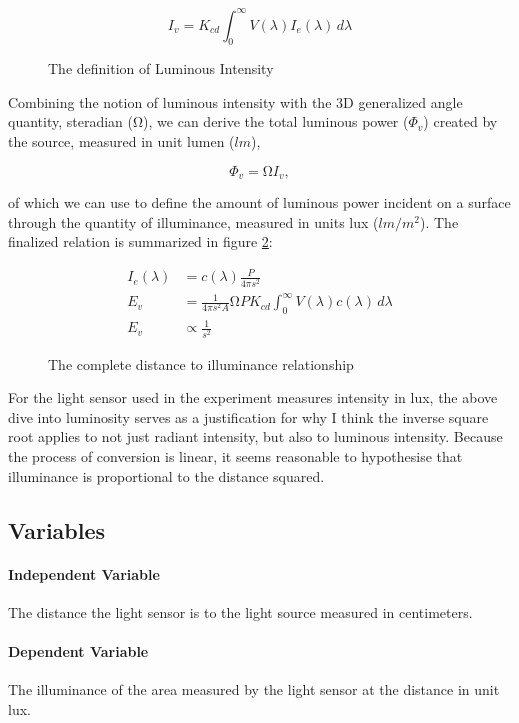\documentclass[a4paper,12pt]{article}
\begin{document}
\begin{figure}[h!]
    \[
     I_v = K_{cd} \int_{0}^{\infty} V(\lambda) I_e(\lambda) \, d\lambda
    \]
    \caption{The definition of Luminous Intensity}
    \label{eq:li}
\end{figure}

Combining the notion of luminous intensity with the 3D generalized angle quantity, steradian ($\si{\ohm}$), we can derive the total luminous power ($\Phi_v$) created by the source, measured in unit lumen ($\si{lm}$),

\[
    \Phi_v = \si{\ohm} I_v,
\]

of which we can use to define the amount of luminous power incident on a surface through the quantity of illuminance, measured in units lux ($\si{lm\per m^2}$). The finalized relation is summarized in figure \ref{eq:dti}:

\begin{figure}[h!]
 \centering
 \begin{align*}
 I_e(\lambda) &= c(\lambda) \frac{P}{4\pi s^2}\\
  E_v &= \frac{1}{4\pi s^2 A} \si{\ohm} P K_{cd} \int_{0}^{\infty} V(\lambda) c(\lambda) \, d\lambda\\
  E_v & \propto \frac{1}{s^2}
 \end{align*}
 \caption{The complete distance to illuminance relationship}
 \label{eq:dti}
\end{figure}


For the light sensor used in the experiment measures intensity in lux, the above dive into luminosity serves as a justification for why I think the inverse square root applies to not just radiant intensity, but also to luminous intensity. Because the process of conversion is linear, it seems reasonable to hypothesise that illuminance is proportional to the distance squared.


\subsection{Variables}
\paragraph{Independent Variable}
The distance the light sensor is to the light source measured in centimeters.

\paragraph{Dependent Variable}
The illuminance of the area measured by the light sensor at the distance in unit lux.
\end{document}
